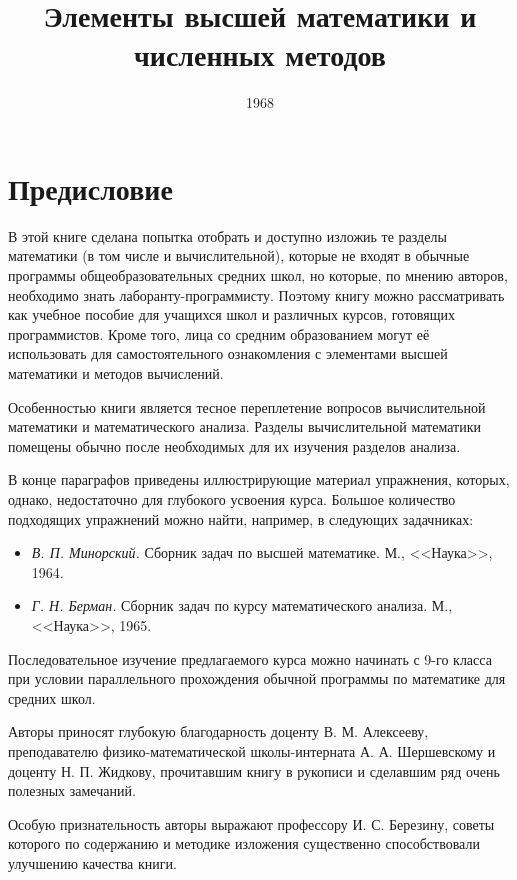 
\title{Элементы высшей математики и численных методов}
\date{1968}

\maketitle
\tableofcontents
\section{Предисловие}
В этой книге сделана попытка отобрать и доступно изложиь те разделы математики
(в том числе и вычислительной), которые не входят в обычные программы
общеобразовательных средних школ, но которые, по мнению авторов, необходимо
знать лаборанту-программисту. Поэтому книгу можно рассматривать как учебное
пособие для учащихся школ и различных курсов, готовящих программистов. Кроме
того, лица со средним образованием могут её использовать для самостоятельного
ознакомления с элементами высшей математики и методов вычислений.

Особенностью книги является тесное переплетение вопросов вычислительной
математики и математического анализа. Разделы вычислительной математики
помещены обычно после необходимых для их изучения разделов анализа.

В конце параграфов приведены иллюстрирующие материал упражнения, которых,
однако, недостаточно для глубокого усвоения курса. Большое количество
подходящих упражнений можно найти, например, в следующих задачниках:

\begin{itemize}
	\item \textit{В. П. Минорский.} Сборник задач по высшей математике. М.,
		<<Наука>>, 1964.
	\item \textit{Г. Н. Берман.} Сборник задач по курсу математического анализа. М.,
		<<Наука>>, 1965.
\end{itemize}

Последовательное изучение предлагаемого курса можно начинать с 9-го класса при
условии параллельного прохождения обычной программы по математике для средних
школ.

Авторы приносят глубокую благодарность доценту В. М. Алексееву, преподавателю
физико-математической школы-интерната А. А. Шершевскому и доценту Н. П.
Жидкову, прочитавшим книгу в рукописи и сделавшим ряд очень полезных замечаний.

Особую признательность авторы выражают профессору И. С. Березину, советы
которого по содержанию и методике изложения существенно способствовали
улучшению качества книги.

